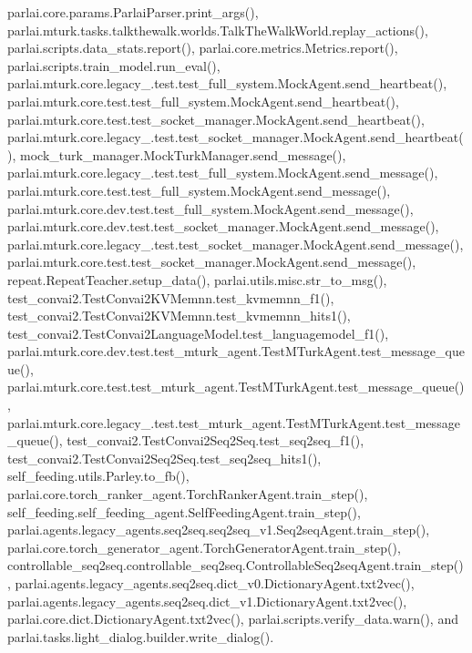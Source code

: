 parlai.\+core.\+params.\+Parlai\+Parser.\+print\+\_\+args(), parlai.\+mturk.\+tasks.\+talkthewalk.\+worlds.\+Talk\+The\+Walk\+World.\+replay\+\_\+actions(), parlai.\+scripts.\+data\+\_\+stats.\+report(), parlai.\+core.\+metrics.\+Metrics.\+report(), parlai.\+scripts.\+train\+\_\+model.\+run\+\_\+eval(), parlai.\+mturk.\+core.\+legacy\+\_.\+test.\+test\+\_\+full\+\_\+system.\+Mock\+Agent.\+send\+\_\+heartbeat(), parlai.\+mturk.\+core.\+test.\+test\+\_\+full\+\_\+system.\+Mock\+Agent.\+send\+\_\+heartbeat(), parlai.\+mturk.\+core.\+test.\+test\+\_\+socket\+\_\+manager.\+Mock\+Agent.\+send\+\_\+heartbeat(), parlai.\+mturk.\+core.\+legacy\+\_.\+test.\+test\+\_\+socket\+\_\+manager.\+Mock\+Agent.\+send\+\_\+heartbeat(), mock\+\_\+turk\+\_\+manager.\+Mock\+Turk\+Manager.\+send\+\_\+message(), parlai.\+mturk.\+core.\+legacy\+\_.\+test.\+test\+\_\+full\+\_\+system.\+Mock\+Agent.\+send\+\_\+message(), parlai.\+mturk.\+core.\+test.\+test\+\_\+full\+\_\+system.\+Mock\+Agent.\+send\+\_\+message(), parlai.\+mturk.\+core.\+dev.\+test.\+test\+\_\+full\+\_\+system.\+Mock\+Agent.\+send\+\_\+message(), parlai.\+mturk.\+core.\+dev.\+test.\+test\+\_\+socket\+\_\+manager.\+Mock\+Agent.\+send\+\_\+message(), parlai.\+mturk.\+core.\+legacy\+\_.\+test.\+test\+\_\+socket\+\_\+manager.\+Mock\+Agent.\+send\+\_\+message(), parlai.\+mturk.\+core.\+test.\+test\+\_\+socket\+\_\+manager.\+Mock\+Agent.\+send\+\_\+message(), repeat.\+Repeat\+Teacher.\+setup\+\_\+data(), parlai.\+utils.\+misc.\+str\+\_\+to\+\_\+msg(), test\+\_\+convai2.\+Test\+Convai2\+K\+V\+Memnn.\+test\+\_\+kvmemnn\+\_\+f1(), test\+\_\+convai2.\+Test\+Convai2\+K\+V\+Memnn.\+test\+\_\+kvmemnn\+\_\+hits1(), test\+\_\+convai2.\+Test\+Convai2\+Language\+Model.\+test\+\_\+languagemodel\+\_\+f1(), parlai.\+mturk.\+core.\+dev.\+test.\+test\+\_\+mturk\+\_\+agent.\+Test\+M\+Turk\+Agent.\+test\+\_\+message\+\_\+queue(), parlai.\+mturk.\+core.\+test.\+test\+\_\+mturk\+\_\+agent.\+Test\+M\+Turk\+Agent.\+test\+\_\+message\+\_\+queue(), parlai.\+mturk.\+core.\+legacy\+\_.\+test.\+test\+\_\+mturk\+\_\+agent.\+Test\+M\+Turk\+Agent.\+test\+\_\+message\+\_\+queue(), test\+\_\+convai2.\+Test\+Convai2\+Seq2\+Seq.\+test\+\_\+seq2seq\+\_\+f1(), test\+\_\+convai2.\+Test\+Convai2\+Seq2\+Seq.\+test\+\_\+seq2seq\+\_\+hits1(), self\+\_\+feeding.\+utils.\+Parley.\+to\+\_\+fb(), parlai.\+core.\+torch\+\_\+ranker\+\_\+agent.\+Torch\+Ranker\+Agent.\+train\+\_\+step(), self\+\_\+feeding.\+self\+\_\+feeding\+\_\+agent.\+Self\+Feeding\+Agent.\+train\+\_\+step(), parlai.\+agents.\+legacy\+\_\+agents.\+seq2seq.\+seq2seq\+\_\+v1.\+Seq2seq\+Agent.\+train\+\_\+step(), parlai.\+core.\+torch\+\_\+generator\+\_\+agent.\+Torch\+Generator\+Agent.\+train\+\_\+step(), controllable\+\_\+seq2seq.\+controllable\+\_\+seq2seq.\+Controllable\+Seq2seq\+Agent.\+train\+\_\+step(), parlai.\+agents.\+legacy\+\_\+agents.\+seq2seq.\+dict\+\_\+v0.\+Dictionary\+Agent.\+txt2vec(), parlai.\+agents.\+legacy\+\_\+agents.\+seq2seq.\+dict\+\_\+v1.\+Dictionary\+Agent.\+txt2vec(), parlai.\+core.\+dict.\+Dictionary\+Agent.\+txt2vec(), parlai.\+scripts.\+verify\+\_\+data.\+warn(), and parlai.\+tasks.\+light\+\_\+dialog.\+builder.\+write\+\_\+dialog().


